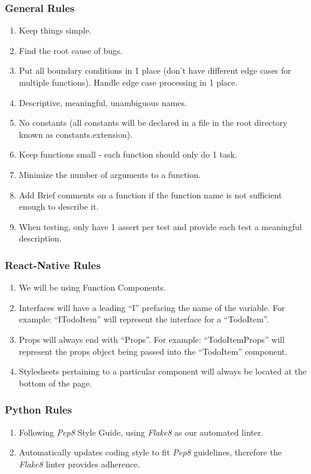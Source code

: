 \documentclass[11pt, oneside]{article}   	%
\begin{document}
\subsubsection*{General Rules}
\begin{enumerate}
\item Keep things simple.
\item Find the root cause of bugs.
\item Put all boundary conditions in 1 place (don’t have different edge cases for multiple functions). Handle edge case processing in 1 place.
\item Descriptive, meaningful, unambiguous names.
\item No constants (all constants will be declared in a file in the root directory known as constants.extension).
\item Keep functions small - each function should only do 1 task.
\item Minimize the number of arguments to a function.
\item Add Brief comments on a function if the function name is not sufficient enough to describe it.
\item When testing, only have 1 assert per test and provide each test a meaningful description.
\end{enumerate}

\pagebreak
\subsubsection*{React-Native Rules}
\begin{enumerate}
\item We will be using Function Components. 
\item Interfaces will have a leading “I” prefacing the name of the variable. For example: “ITodoItem” will represent the interface for a “TodoItem”.
\item Props will always end with “Props”. For example: “TodoItemProps” will represent the props object being passed into the “TodoItem” component. 
\item Stylesheets pertaining to a particular component will always be located at the bottom of the page.
\end{enumerate}


\subsubsection*{Python Rules}
\begin{enumerate}
\item Following {\it Pep8} Style Guide, using {\it Flake8} as our automated linter.
\item Automatically updates coding style to fit {\it Pep8} guidelines, therefore the {\it Flake8} linter provides adherence.
\end{enumerate}
\end{document}
